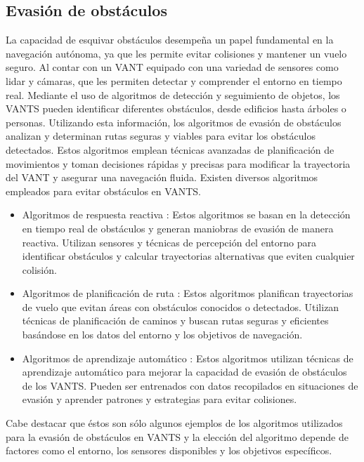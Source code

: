 \documentclass[sigconf]{acmart}
\begin{document}
\subsection*{Evasión de obstáculos}

La capacidad de esquivar obstáculos desempeña un papel fundamental en la navegación autónoma, ya que les permite evitar colisiones y mantener un vuelo seguro. Al contar con un VANT equipado con una variedad de sensores como lidar y cámaras, que les permiten detectar y comprender el entorno en tiempo real. Mediante el uso de algoritmos de detección y seguimiento de objetos, los VANTS pueden identificar diferentes obstáculos, desde edificios hasta árboles o personas. Utilizando esta información, los algoritmos de evasión de obstáculos analizan y determinan rutas seguras y viables para evitar los obstáculos detectados. Estos algoritmos emplean técnicas avanzadas de planificación de movimientos y toman decisiones rápidas y precisas para modificar la trayectoria del VANT y asegurar una navegación fluida. Existen diversos algoritmos empleados para evitar obstáculos en VANTS.

\begin{itemize}
\item Algoritmos de respuesta reactiva \cite{ReactiveCA}: Estos algoritmos se basan en la detección en tiempo real de obstáculos y generan maniobras de evasión de manera reactiva. Utilizan sensores y técnicas de percepción del entorno para identificar obstáculos y calcular trayectorias alternativas que eviten cualquier colisión.
\item Algoritmos de planificación de ruta \cite{ACA}: Estos algoritmos planifican trayectorias de vuelo que evitan áreas con obstáculos conocidos o detectados. Utilizan técnicas de planificación de caminos y buscan rutas seguras y eficientes basándose en los datos del entorno y los objetivos de navegación.
\item Algoritmos de aprendizaje automático \cite{AACA}: Estos algoritmos utilizan técnicas de aprendizaje automático para mejorar la capacidad de evasión de obstáculos de los VANTS. Pueden ser entrenados con datos recopilados en situaciones de evasión y aprender patrones y estrategias para evitar colisiones.
\end{itemize}
  
Cabe destacar que éstos son sólo algunos ejemplos de los algoritmos utilizados para la evasión de obstáculos en VANTS y la elección del algoritmo depende de factores como el entorno, los sensores disponibles y los objetivos específicos.
\end{document}
